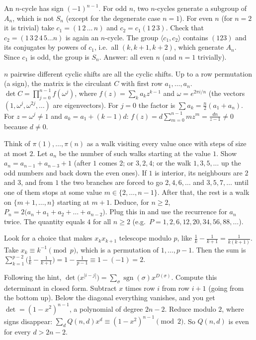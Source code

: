 \documentclass[11pt,a4paper]{article}
\begin{document}
 An $n$-cycle has sign $(-1)^{n-1}$. For odd $n$, two $n$-cycles generate a subgroup of $A_n$, which is not $S_n$ (except for the degenerate case $n=1$).
 For even $n$ (for $n=2$ it is trivial) take $c_1=(1\,2\,\dots\,n)$ and $c_2=c_1(1\,2\,3)$. Check that $c_2=(1\,3\,2\,4\,5\dots n)$ is again an $n$-cycle.
 The group $\langle c_1,c_2\rangle$ contains $(123)$ and its conjugates by powers of $c_1$, i.e.\ all $(k,k+1,k+2)$, which generate $A_n$. Since $c_1$ is odd, the group is $S_n$. Answer: all even $n$ (and $n=1$ trivially).

 $n$ pairwise different cyclic shifts are all the cyclic shifts. Up to a row permutation (a sign), the matrix is the circulant $C$ with first row $a_1,\dots,a_n$.
 $\det C=\prod_{j=0}^{n-1}f(\omega^j)$, where $f(z)=\sum_k a_kz^{k-1}$ and $\omega=e^{2\pi i/n}$ (the vectors $(1,\omega^j,\omega^{2j},\dots)$ are eigenvectors). For $j=0$ the factor is $\sum a_k=\frac n2(a_1+a_n)$.
 For $z=\omega^j\ne1$ and $a_k=a_1+(k-1)d$: $f(z)=d\sum_{m=0}^{n-1}mz^m=\frac{dn}{z-1}\ne0$ because $d\ne0$.

 Think of $\pi(1),\dots,\pi(n)$ as a walk visiting every value once with steps of size at most $2$. Let $a_n$ be the number of such walks starting at the value $1$. Show $a_n=a_{n-1}+a_{n-3}+1$ (after $1$ comes $2$; or $3,2,4$; or the walk $1,3,5,\dots$ up the odd numbers and back down the even ones).
 If $1$ is interior, its neighbours are $2$ and $3$, and from $1$ the two branches are forced to go $2,4,6,\dots$ and $3,5,7,\dots$ until one of them stops at some value $m\in\{2,\dots,n-1\}$. After that, the rest is a walk on $\{m+1,\dots,n\}$ starting at $m+1$. Deduce, for $n\ge2$, $P_n=2\bigl(a_n+a_1+a_2+\dots+a_{n-2}\bigr)$.
 Plug this in and use the recurrence for $a_n$ twice. The quantity equals $4$ for all $n\ge2$ (e.g.\ $P=1,2,6,12,20,34,56,88,\dots$).

 Look for a choice that makes $x_kx_{k+1}$ telescope modulo $p$, like $\frac1k-\frac1{k+1}=\frac1{k(k+1)}$.
 Take $x_k\equiv k^{-1}\pmod p$, which is a permutation of $1,\dots,p-1$. Then the sum is $\sum_{k=1}^{p-2}\bigl(\frac1k-\frac1{k+1}\bigr)=1-\frac1{p-1}\equiv1-(-1)=2$.

 Following the hint, $\det\bigl(x^{|i-j|}\bigr)=\sum_\sigma\operatorname{sgn}(\sigma)x^{D(\sigma)}$. Compute this determinant in closed form.
 Subtract $x$ times row $i$ from row $i+1$ (going from the bottom up). Below the diagonal everything vanishes, and you get $\det=(1-x^2)^{n-1}$, a polynomial of degree $2n-2$.
 Reduce modulo $2$, where signs disappear: $\sum_dQ(n,d)x^d\equiv(1-x^2)^{n-1}\pmod2$. So $Q(n,d)$ is even for every $d>2n-2$.
\end{document}
